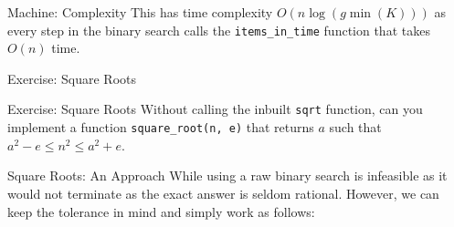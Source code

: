 \documentclass[9pt]{beamer}
\newenvironment{exbox}[1]{\begin{block}{Exercise: #1}}{\end{block}}
\begin{document}
\begin{frame}{Machine: Complexity}
This has time complexity $O(n \log(g \min(K)))$ as every step in the binary search calls the \texttt{items\_in\_time} function that takes $O(n)$ time.
\end{frame}

\begin{frame}{Exercise: Square Roots}
\begin{exbox}{Square Roots}
Without calling the inbuilt \texttt{sqrt} function, can you implement a function \texttt{square\_root(n, e)} that returns $a$ such that $a^2 - e \leq n^2 \leq a^2 + e$.
\end{exbox}
\end{frame}

\begin{frame}{Square Roots: An Approach}
While using a raw binary search is infeasible as it would not terminate as the exact answer is seldom rational. However, we can keep the tolerance in mind and simply work as follows:
\end{frame}
\end{document}
